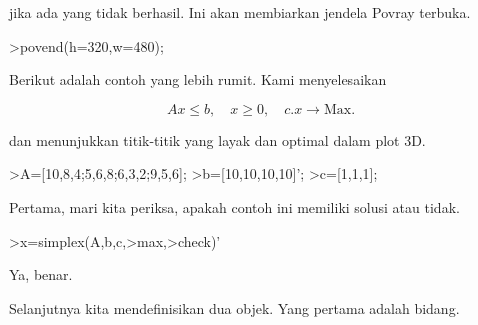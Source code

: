\documentclass{article}
\begin{document}
\begin{eulernotebook}
\begin{eulercomment}
jika ada yang tidak berhasil. Ini akan membiarkan jendela Povray
terbuka.
\end{eulercomment}
\begin{eulerprompt}
>povend(h=320,w=480);
\end{eulerprompt}
\begin{eulercomment}
Berikut adalah contoh yang lebih rumit. Kami menyelesaikan

\end{eulercomment}
\begin{eulerformula}
\[
Ax \le b, \quad x \ge 0, \quad c.x \to \text{Max.}
\]
\end{eulerformula}
\begin{eulercomment}
dan menunjukkan titik-titik yang layak dan optimal dalam plot 3D.
\end{eulercomment}
\begin{eulerprompt}
>A=[10,8,4;5,6,8;6,3,2;9,5,6];
>b=[10,10,10,10]';
>c=[1,1,1];
\end{eulerprompt}
\begin{eulercomment}
Pertama, mari kita periksa, apakah contoh ini memiliki solusi atau
tidak.
\end{eulercomment}
\begin{eulerprompt}
>x=simplex(A,b,c,>max,>check)'
\end{eulerprompt}
\begin{euleroutput}
  [0,  1,  0.5]
\end{euleroutput}
\begin{eulercomment}
Ya, benar.

Selanjutnya kita mendefinisikan dua objek. Yang pertama adalah bidang.


\end{eulercomment}
\end{eulernotebook}
\end{document}

